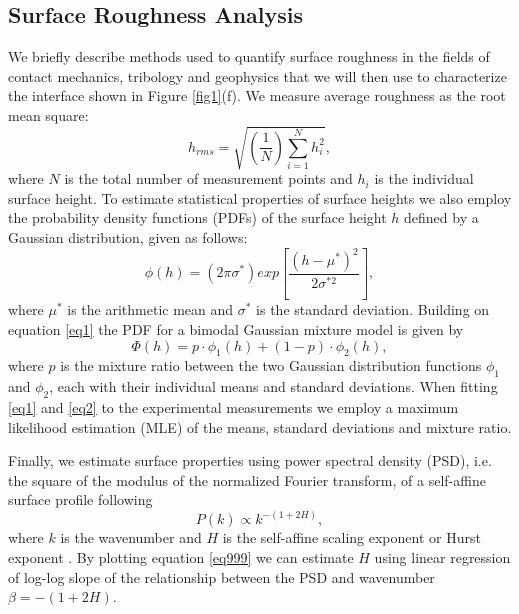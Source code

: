 \documentclass[preprint,1p, 10pt,authoryear]{elsarticle}
\begin{document}
\subsection{Surface Roughness Analysis}
\label{SRA}
We briefly describe methods used to quantify surface roughness in the fields of contact mechanics, tribology and geophysics that we will then use to characterize the interface shown in Figure \ref{fig1}(f). We measure average roughness as the root mean square:
\begin{equation}
h_{rms} = \sqrt{\left(\frac{1}{N} \right) \sum^{N}_{i=1} h_{i}^{2}} ,
\label{eq99}
\end{equation}
\noindent where $N$ is the total number of measurement points and $h_{i}$ is the individual surface height. To estimate statistical properties of surface heights we also employ the probability density functions (PDFs) of the surface height $h$ defined by a Gaussian distribution, given as follows:
\begin{equation}
\phi(h) = \left( 2\pi \sigma^{*} \right) exp\left[ \frac{\left(h - \mu^{*}\right)^{2}} { 2\sigma^{*2}}  \right],
\label{eq1}
\end{equation} 
\noindent where $\mu^{*}$ is the arithmetic mean and $\sigma^{*}$ is the standard deviation. Building on equation \eqref{eq1} the PDF for a bimodal Gaussian mixture model is given by 
\begin{equation}
\Phi(h) = p\cdot \phi_{1}(h)+\left(1-p\right)\cdot \phi_{2}(h),
\label{eq2}
\end{equation}
\noindent where $p$ is the mixture ratio between the two Gaussian distribution functions $\phi_{1}$ and $\phi_{2}$, each with their individual means and standard deviations. When fitting \eqref{eq1} and \eqref{eq2} to the experimental measurements we employ a maximum likelihood estimation (MLE) of the means, standard deviations and mixture ratio. 

Finally, we estimate surface properties using power spectral density (PSD), i.e.  the square of the modulus of the normalized Fourier transform, of a self-affine surface profile following 
\begin{equation}
P(k) \propto k^{-(1+2H)},
\label{eq999}
\end{equation}
\noindent where $k$ is the wavenumber and $H$ is the self-affine scaling exponent or Hurst exponent \citep{Power1991, Schmittbuhl1995, Mai2002, Candela2009}. By plotting equation \eqref{eq999} we can estimate $H$ using linear regression of log-log slope of the relationship between the PSD and wavenumber $\beta =-(1+2H)$.  
\end{document}
